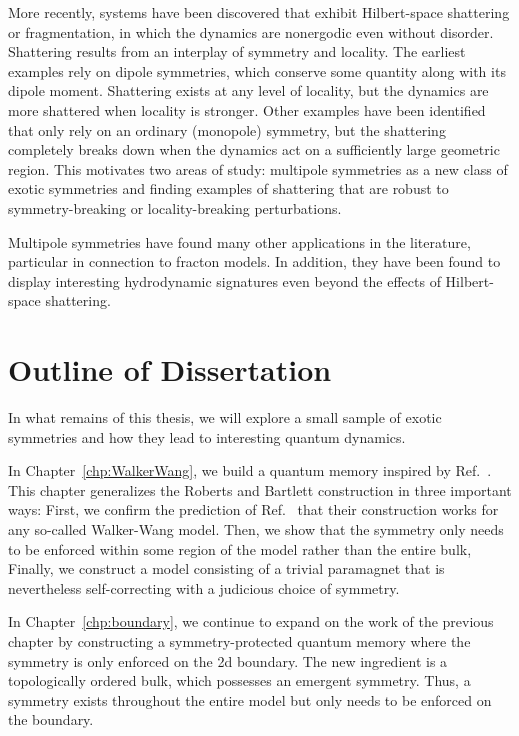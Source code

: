 More recently, systems have been discovered that exhibit Hilbert-space shattering or fragmentation, in which the dynamics are nonergodic even without disorder. Shattering results from an interplay of symmetry and locality. The earliest examples rely on dipole symmetries, which conserve some quantity along with its dipole moment. Shattering exists at any level of locality, but the dynamics are more shattered when locality is stronger. Other examples have been identified that only rely on an ordinary (monopole) symmetry, but the shattering completely breaks down when the dynamics act on a sufficiently large geometric region. This motivates two areas of study: multipole symmetries as a new class of exotic symmetries and finding examples of shattering that are robust to symmetry-breaking or locality-breaking perturbations.

Multipole symmetries have found many other applications in the literature, particular in connection to fracton models. In addition, they have been found to display interesting hydrodynamic signatures even beyond the effects of Hilbert-space shattering.

\section{Outline of Dissertation}

In what remains of this thesis, we will explore a small sample of exotic symmetries and how they lead to interesting quantum dynamics.

In Chapter~\ref{chp:WalkerWang}, we build a quantum memory inspired by Ref.~\cite{RobertsBartlett2020}. This chapter generalizes the Roberts and Bartlett construction in three important ways: First, we confirm the prediction of Ref.~\cite{RobertsBartlett2020} that their construction works for any so-called Walker-Wang model. Then, we show that the symmetry only needs to be enforced within some region of the model rather than the entire bulk, Finally, we construct a model consisting of a trivial paramagnet that is nevertheless self-correcting with a judicious choice of symmetry.

In Chapter~\ref{chp:boundary}, we continue to expand on the work of the previous chapter by constructing a symmetry-protected quantum memory where the symmetry is only enforced on the 2d boundary. The new ingredient is a topologically ordered bulk, which possesses an emergent symmetry. Thus, a symmetry exists throughout the entire model but only needs to be enforced on the boundary. 

